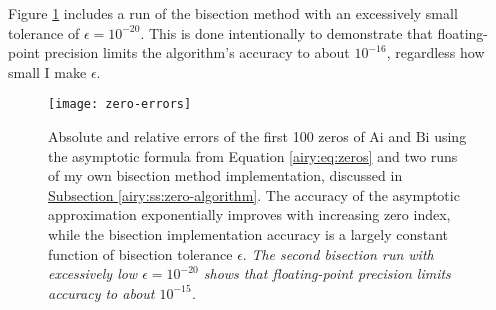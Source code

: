 \documentclass[11pt, a4paper]{article}
\newcommand{\Ai}{\mathrm{Ai}}
\newcommand{\Bi}{\mathrm{Bi}}
\begin{document}
Figure \ref{airy:fig:zero-erors} includes a run of the bisection method with an excessively small tolerance of $ \epsilon = 10^{-20} $. This is done intentionally to demonstrate that floating-point precision limits the algorithm's accuracy to about $ 10^{-16} $, regardless how small I make $ \epsilon $. 

\vspace{-3mm}
\begin{figure}[htb!]
	\centering
	\texttt{[image: zero-errors]}
	\vspace{-8mm}
	\caption{Absolute and relative errors of the first 100 zeros of $ \Ai $ and $ \Bi $ using the asymptotic formula from Equation \ref{airy:eq:zeros} and two runs of my own bisection method implementation, discussed in \hyperref[airy:ss:zero-algorithm]{\underline{Subsection \ref{airy:ss:zero-algorithm}}}. The accuracy of the asymptotic approximation exponentially improves with increasing zero index, while the bisection implementation accuracy is a largely constant function of bisection tolerance $ \epsilon $. \textit{The second bisection run with excessively low $ \epsilon = 10^{-20} $ shows that floating-point precision limits accuracy to about $ 10^{-15} $.}}
	\label{airy:fig:zero-erors}
\end{figure}

\vspace{-5mm}
\end{document}
